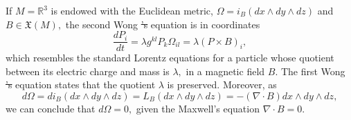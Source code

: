 \documentclass[12pt, letterpaper, reqno]{amsart}
\theoremstyle{definition}
\theoremstyle{plain}
\theoremstyle{remark}
\providecommand{\DIFdel}[1]{{\protect\color{red}\sout{#1}}}                      %
\providecommand{\DIFdelbegin}{} %
\providecommand{\DIFdelend}{} %
\newcommand{\DIFscaledelfig}{0.5}
\newlength{\DIFdelgraphicswidth} %
\newlength{\DIFdelgraphicsheight} %
\newcommand{\DIFdelincludegraphics}[2][]{%
\sbox{\DIFdelgraphicsbox}{\DIFOincludegraphics[#1]{#2}}%
\settoboxwidth{\DIFdelgraphicswidth}{\DIFdelgraphicsbox} %
\settoboxtotalheight{\DIFdelgraphicsheight}{\DIFdelgraphicsbox} %
\scalebox{\DIFscaledelfig}{%
\parbox[b]{\DIFdelgraphicswidth}{\usebox{\DIFdelgraphicsbox}\\[-\baselineskip] \rule{\DIFdelgraphicswidth}{0em}}\llap{\resizebox{\DIFdelgraphicswidth}{\DIFdelgraphicsheight}{%
\setlength{\unitlength}{\DIFdelgraphicswidth}%
\begin{picture}(1,1)%
\thicklines\linethickness{2pt} %
{\color[rgb]{1,0,0}\put(0,0){\framebox(1,1){}}}%
{\color[rgb]{1,0,0}\put(0,0){\line( 1,1){1}}}%
{\color[rgb]{1,0,0}\put(0,1){\line(1,-1){1}}}%
\end{picture}%
}\hspace*{3pt}}} %
} %
\DeclareRobustCommand{\DIFdelbegin}{\DIFOdelbegin \let\includegraphics\DIFdelincludegraphics} %
\DeclareRobustCommand{\DIFdelend}{\DIFOaddend \let\includegraphics\DIFOincludegraphics} %
\begin{document}
If $ M = \mathbb{R}^3$ is endowed with the Euclidean metric, $ \Omega = i_B(dx\wedge dy\wedge dz) $ and $ B\in \mathfrak{X}(M), $ the second Wong \DIFdelbegin \DIFdel{'s }\DIFdelend equation is in coordinates 
$$ \frac{d P_i}{dt} = \lambda g^{kl} P_k \Omega_{il} = \lambda (P\times B)_i, $$ 
which resembles the standard Lorentz equations for a particle whose quotient between its electric charge and mass is $ \lambda, $ in a magnetic field $ B. $ The first Wong \DIFdelbegin \DIFdel{'s }\DIFdelend equation states that the quotient $\lambda$ is preserved. Moreover, as
\begin{dmath*}
	d\Omega = di_B(dx\wedge dy\wedge dz) = L_B(dx\wedge dy\wedge dz) = -(\nabla\cdot B) dx\wedge dy\wedge dz,	
\end{dmath*}
we can conclude that $ d\Omega=0, $ given the Maxwell's equation $ \nabla\cdot B=0. $ 
\newpage

\nocite{*}

\end{document}
